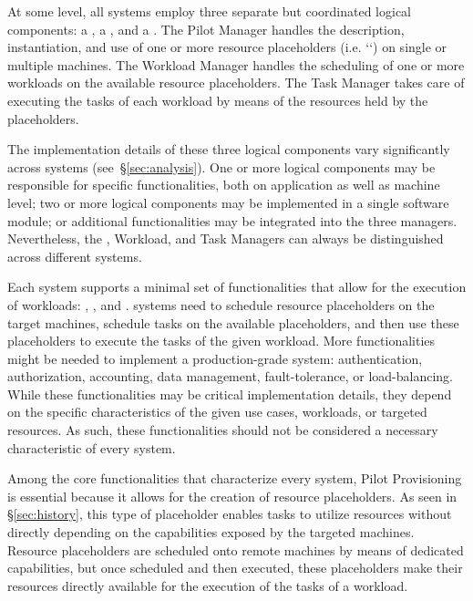 \documentclass{sig-alternate}
\begin{document}
At some level, all \pilotjob systems employ three separate but coordinated
logical components: a , a , and a
. The Pilot Manager handles the description, instantiation,
and use of one or more resource placeholders (i.e. `\pilots`) on single or
multiple machines. The Workload Manager handles the scheduling of one or more
workloads on the available resource placeholders. The Task Manager takes care of
executing the tasks of each workload by means of the resources held by the
placeholders.

The implementation details of these three logical components vary significantly
across \pilotjob systems (see~\S\ref{sec:analysis}). One or more logical
components may be responsible for specific functionalities, both on application
as well as machine level; two or more logical components may be implemented in a
single software module; or additional functionalities may be integrated into the
three managers. Nevertheless, the \pilot, Workload, and Task Managers can always
be distinguished across different \pilotjob systems.

Each \pilotjob system supports a minimal set of functionalities that allow for
the execution of workloads: , , and . \pilotjob systems need to schedule
resource placeholders on the target machines, schedule tasks on the available
placeholders, and then use these placeholders to execute the tasks of the given
workload. More functionalities might be needed to implement a production-grade
\pilotjob system: authentication, authorization, accounting, data management,
fault-tolerance, or load-balancing. While these functionalities may be critical
implementation details, they depend on the specific characteristics of the given
use cases, workloads, or targeted resources. As such, these functionalities
should not be considered a necessary characteristic of every \pilotjob system.

Among the core functionalities that characterize every \pilotjob system, Pilot
Provisioning is essential because it allows for the creation of resource
placeholders. As seen in \S\ref{sec:history}, this type of placeholder enables
tasks to utilize resources without directly depending on the capabilities
exposed by the targeted machines. Resource placeholders are scheduled onto
remote machines by means of dedicated capabilities, but once scheduled and then
executed, these placeholders make their resources directly available for the
execution of the tasks of a workload.  
\end{document}
